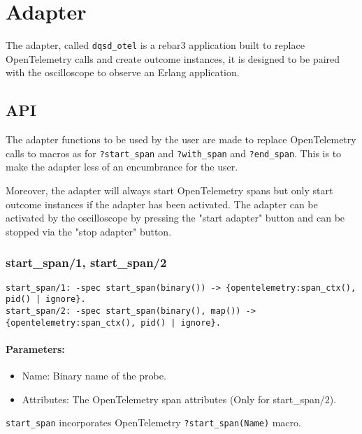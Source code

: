 \section{Adapter}
    The adapter, called \texttt{dqsd\_otel} is a rebar3 \cite{rebar3} application built to replace OpenTelemetry calls and create outcome instances, it is designed to be paired with the oscilloscope to observe an Erlang application.
    
    \subsection{API}
        The adapter functions to be used by the user are made to replace OpenTelemetry calls to macros as for \texttt{?start\_span} and \texttt{?with\_span} and \texttt{?end\_span}. This is to make the adapter less of an encumbrance for the user. 

        Moreover, the adapter will always start OpenTelemetry spans but only start outcome instances if the adapter has been activated. The adapter can be activated by the oscilloscope by pressing the "start adapter" button and can be stopped via the "stop adapter" button.
         
        \subsubsection{start\_span/1, start\_span/2}
        
        \begin{verbatim}        
start_span/1: -spec start_span(binary()) -> {opentelemetry:span_ctx(), pid() | ignore}.
start_span/2: -spec start_span(binary(), map()) -> {opentelemetry:span_ctx(), pid() | ignore}.  
        \end{verbatim}
        
        \paragraph{Parameters:}
        \begin{itemize}
            \item Name: Binary name of the probe.
            \item Attributes: The OpenTelemetry span attributes (Only for start\_span/2).
        \end{itemize} 
        
        \texttt{start\_span} incorporates OpenTelemetry \texttt{?start\_span(Name)} macro.
        
